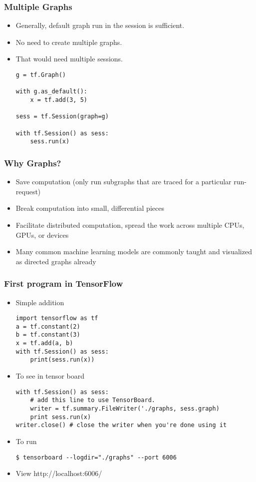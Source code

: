 \begin{frame}[fragile] \frametitle{Multiple Graphs}

\begin{itemize}
\item Generally, default graph run in the session is sufficient. 
\item No need to create multiple graphs. 
\item That would need multiple sessions.
\begin{lstlisting}
g = tf.Graph()

with g.as_default():
    x = tf.add(3, 5)

sess = tf.Session(graph=g)

with tf.Session() as sess:
    sess.run(x)
\end{lstlisting}
\end{itemize}
\end{frame}


\begin{frame}[fragile] \frametitle{Why Graphs?}
\begin{itemize}
\item Save computation (only run subgraphs that are traced for a particular run-request)
\item Break computation into small, differential pieces 
\item Facilitate distributed computation, spread the work across multiple CPUs, GPUs, or devices
\item Many common machine learning models are commonly taught and visualized as directed graphs already
\end{itemize}
\end{frame}


\begin{frame}[fragile] \frametitle{First program in TensorFlow}
\begin{itemize}
\item Simple addition
\begin{lstlisting}
import tensorflow as tf
a = tf.constant(2)
b = tf.constant(3)
x = tf.add(a, b)
with tf.Session() as sess:
    print(sess.run(x))
\end{lstlisting}
\item To see in tensor board
\begin{lstlisting}
with tf.Session() as sess:
	# add this line to use TensorBoard. 
	writer = tf.summary.FileWriter('./graphs, sess.graph) 
	print sess.run(x)
writer.close() # close the writer when you're done using it
\end{lstlisting}
\item To run
\begin{lstlisting}
$ tensorboard --logdir="./graphs" --port 6006
\end{lstlisting}
\item View http://localhost:6006/
\end{itemize}
\end{frame}


